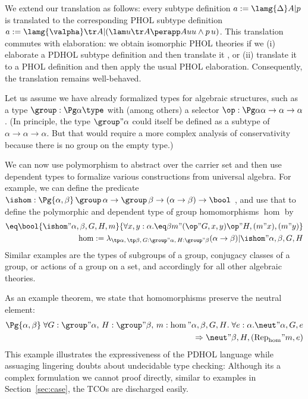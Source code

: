We extend our translation as follows: every subtype definition $a:=\lamg{\Delta}A|p$ is translated to the corresponding PHOL subtype definition $a:=\lamg{\valpha} \tr A|(\lam u{\tr A}\perapp Auu\wedge p\,u)$.
This translation commutes with elaboration: we obtain isomorphic PHOL theories if we (i)
elaborate a PDHOL subtype definition and then translate it %
, or (ii) translate it to a PHOL definition and then apply the usual PHOL elaboration.
Consequently, %
the translation remains well-behaved.

\newcommand{\Rep}[1]{\mathrm{Rep}_{#1}}
\newcommand{\Abs}[1]{\mathrm{Abs}_{#1}}

\begin{example}
Let us assume we have already formalized types for algebraic structures, such as a type $\group:\Pg\alpha\type$ with (among others) a selector $\op:\Pg\alpha\alpha\to\alpha\to\alpha$.
(In principle, the type $\group"\alpha$ could itself be defined as a subtype of $\alpha\to\alpha\to\alpha$.
But that would require a more complex analysis of conservativity because there is no group on the empty type.)

We can now use polymorphism to abstract over the carrier set and then use dependent types to formalize various constructions from universal algebra.
For example, we can define the predicate $\ishom:\Pg{\alpha,\beta}\,\group\,\alpha\to
\group\,\beta\to (\alpha\to\beta)\to\bool$ %
, and use that to define the polymorphic and dependent type of group homomorphisms \(\hom\) by
\begin{align*}
  \eq\bool{\ishom"{\alpha,\beta,G,H,m}}{\forall
    x,y:\alpha. \eq\beta{m"{(\op"{G,x,y})}}{\op"{H,(m"x),(m"y)}}}\\
  \hom:=\lambda_{\tp\alpha,\,\tp\beta,\,G:\group"\alpha,\,H:\group"\beta}
  (\alpha\to\beta)|\ishom"{\alpha,\beta,G,H}
\end{align*}
Similar examples are the types of subgroups of a group, conjugacy classes of a group, or actions of a group on a set, and accordingly for all other algebraic theories.

As an example theorem, we state that homomorphisms preserve the neutral element:
\begin{align*}
\Pg{\alpha,\beta}\;\forall
  G:\group"\alpha,\,H:\group"\beta,\,m:\hom"{\alpha,\beta,G,H}.\;\forall
  e:\alpha.\neut"{\alpha,G,e}\\
  \Rightarrow\neut"{\beta,H,(\Rep\hom"{m,e})}
\end{align*}
This example illustrates the expressiveness of the PDHOL language while assuaging lingering
doubts about undecidable type checking: Although its a complex formulation we cannot proof directly,
similar to examples in Section~\ref{sec:case}, the TCOs are discharged easily. 
\end{example}

